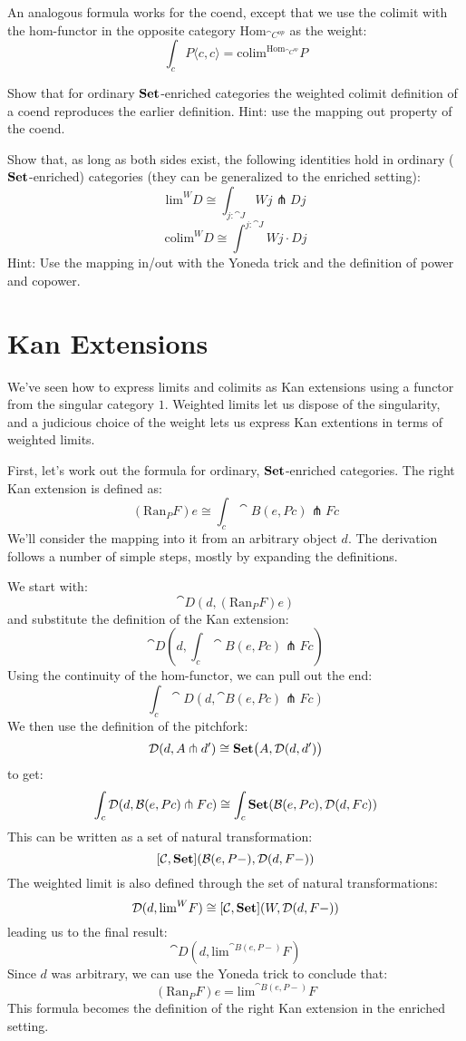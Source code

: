 \documentclass[DaoFP]{subfiles}
\begin{document}
An analogous formula works for the coend, except that we use the colimit with the hom-functor in the opposite category $\text{Hom}_{\cat C^{op}}$ as the weight:
\[  \int_c P\langle c, c\rangle = \text{colim}^{\text{Hom}_{\cat C^{op}}} P\]

\begin{exercise}
Show that for ordinary $\mathbf{Set}$-enriched categories the weighted colimit definition of a coend reproduces the earlier definition. Hint: use the mapping out property of the coend.
\end{exercise}

\begin{exercise}
Show that, as long as both sides exist, the following identities hold in ordinary ($\mathbf{Set}$-enriched) categories (they can be generalized to the enriched setting):
\[ \text{lim}^W D \cong \int_{j \colon \cat J} W j \pitchfork D j \]
\[ \text{colim}^W D \cong \int^{j \colon \cat J} W j \cdot D j \]
Hint: Use the mapping in/out with the Yoneda trick and the definition of power and copower.
\end{exercise}

\section{Kan Extensions}

We've seen how to express limits and colimits as Kan extensions using a functor from the singular category $1$. Weighted limits let us dispose of the singularity, and a judicious choice of the weight lets us express Kan extentions in terms of weighted limits. 

First, let's work out the formula for ordinary, $\mathbf{Set}$-enriched categories. The right Kan extension is defined as:
 \[ (\text{Ran}_P F) e \cong \int_c \cat B (e, P c) \pitchfork F c \]
 We'll consider the mapping into it from an arbitrary object $d$. The derivation follows a number of simple steps, mostly by expanding the definitions. 
 
 We start with:
\[ \cat D(d, (\text{Ran}_P F) e) \]
 and substitute the definition of the Kan extension:
 \[ \cat D(d, \int_c \cat B (e, P c) \pitchfork F c) \]
Using the continuity of the hom-functor, we can pull out the end:
 \[ \int_c \cat D(d,  \cat B (e, P c) \pitchfork F c) \]
We then use the definition of the pitchfork:
\[ \mathcal{D} (d, A \pitchfork d') \cong \mathbf{Set}  \big(A, \mathcal{D}(d, d')\big) \]
to get:
 \[ \int_c \mathcal{D}(d,  \mathcal{B} (e, P c) \pitchfork F c) \cong \int_c \mathbf{Set}( \mathcal{B}(e, P c), \mathcal{D}(d, F c))\]
This can be written as a set of natural transformation:
\[ [\mathcal{C}, \mathbf{Set}] (\mathcal{B}(e, P-), \mathcal{D}(d, F-)) \]
The weighted limit is also defined through the set of natural transformations:
\[  \mathcal D(d, \text{lim}^W F) \cong [\mathcal C, \mathbf{Set}] (W, \mathcal D(d, F-)) \]
leading us to the final result:
\[ \cat D(d, \text{lim}^{\cat B (e, P-)} F) \]
Since $d$ was arbitrary, we can use the Yoneda trick to conclude that:
\[ (\text{Ran}_P F) e = \text{lim}^{\cat B(e, P-)} F  \]
This formula becomes the definition of the right Kan extension in the enriched setting.
\end{document}
